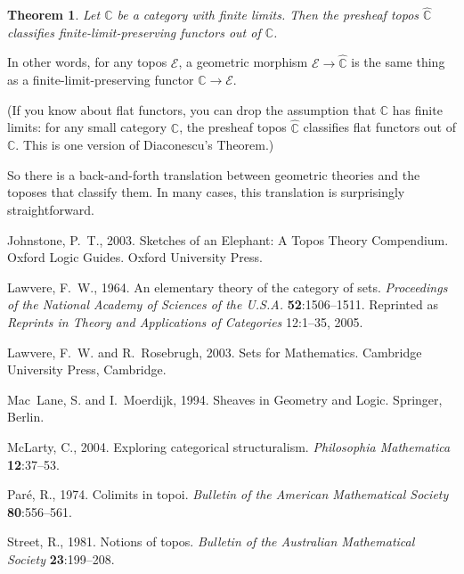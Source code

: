 \documentclass{article}
\newcommand{\cat}[1]{\mathscr{#1}}
\newcommand{\scat}[1]{\mathbb{#1}}
\newcommand{\E}{\cat{E}}
\newcommand{\Psh}[1]{\widehat{#1}}
\newtheorem{thm}{Theorem}[section]
\begin{document}
\begin{thm}
Let $\scat{C}$ be a category with finite limits.  Then the presheaf topos
$\Psh{\scat{C}}$ classifies finite-limit-preserving functors out of
$\scat{C}$. 
\end{thm}
% 
In other words, for any topos $\E$, a geometric morphism $\E \to
\Psh{\scat{C}}$ is the same thing as a finite-limit-preserving functor
$\scat{C} \to \E$.

(If you know about flat functors, you can drop the assumption that $\scat{C}$
has finite limits: for any small category $\scat{C}$, the presheaf topos
$\Psh{\scat{C}}$ classifies flat functors out of $\scat{C}$.  This is
one version of Diaconescu's Theorem.)

So there is a back-and-forth translation between geometric theories and the
toposes that classify them.  In many cases, this translation is surprisingly
straightforward.



\begin{thebibliography}{7}

Johnstone, P.~T., 2003.
\newblock Sketches of an Elephant: A Topos Theory Compendium.
\newblock Oxford Logic Guides. Oxford University Press.

Lawvere, F.~W., 1964.
\newblock An elementary theory of the category of sets.
\newblock \emph{Proceedings of the National Academy of Sciences of the U.S.A.}
  \textbf{52}:1506--1511.
\newblock Reprinted as \emph{Reprints in Theory and Applications of Categories}
  12:1--35, 2005.

Lawvere, F.~W. and R.~Rosebrugh, 2003.
\newblock Sets for Mathematics.
\newblock Cambridge University Press, Cambridge.

Mac~Lane, S. and I.~Moerdijk, 1994.
\newblock Sheaves in Geometry and Logic.
\newblock Springer, Berlin.

Mc{L}arty, C., 2004.
\newblock Exploring categorical structuralism.
\newblock \emph{Philosophia Mathematica} \textbf{12}:37--53.

Par{\'e}, R., 1974.
\newblock Colimits in topoi.
\newblock \emph{Bulletin of the American Mathematical Society}
  \textbf{80}:556--561.

Street, R., 1981.
\newblock Notions of topos.
\newblock \emph{Bulletin of the Australian Mathematical Society}
  \textbf{23}:199--208.

\end{thebibliography}
\end{document}
